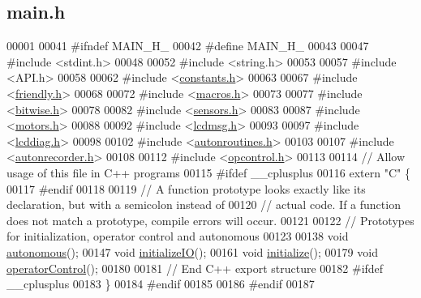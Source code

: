 \hypertarget{main_8h_source}{}\subsection{main.\+h}
\label{main_8h_source}

\begin{DoxyCode}
00001 
00041 \textcolor{preprocessor}{#ifndef MAIN\_H\_}
00042 \textcolor{preprocessor}{#define MAIN\_H\_}
00043 
00047 \textcolor{preprocessor}{#include <stdint.h>}
00048 
00052 \textcolor{preprocessor}{#include <string.h>}
00053 
00057 \textcolor{preprocessor}{#include <API.h>}
00058 
00062 \textcolor{preprocessor}{#include <\hyperlink{constants_8h}{constants.h}>}
00063 
00067 \textcolor{preprocessor}{#include <\hyperlink{friendly_8h}{friendly.h}>}
00068 
00072 \textcolor{preprocessor}{#include <\hyperlink{macros_8h}{macros.h}>}
00073 
00077 \textcolor{preprocessor}{#include <\hyperlink{bitwise_8h}{bitwise.h}>}
00078 
00082 \textcolor{preprocessor}{#include <\hyperlink{sensors_8h}{sensors.h}>}
00083 
00087 \textcolor{preprocessor}{#include <\hyperlink{motors_8h}{motors.h}>}
00088 
00092 \textcolor{preprocessor}{#include <\hyperlink{lcdmsg_8h}{lcdmsg.h}>}
00093 
00097 \textcolor{preprocessor}{#include <\hyperlink{lcddiag_8h}{lcddiag.h}>}
00098 
00102 \textcolor{preprocessor}{#include <\hyperlink{autonroutines_8h}{autonroutines.h}>}
00103 
00107 \textcolor{preprocessor}{#include <\hyperlink{autonrecorder_8h}{autonrecorder.h}>}
00108 
00112 \textcolor{preprocessor}{#include <\hyperlink{opcontrol_8h}{opcontrol.h}>}
00113 
00114 \textcolor{comment}{// Allow usage of this file in C++ programs}
00115 \textcolor{preprocessor}{#ifdef \_\_cplusplus}
00116 \textcolor{keyword}{extern} \textcolor{stringliteral}{"C"} \{
00117 \textcolor{preprocessor}{#endif}
00118 
00119 \textcolor{comment}{// A function prototype looks exactly like its declaration, but with a semicolon instead of}
00120 \textcolor{comment}{// actual code. If a function does not match a prototype, compile errors will occur.}
00121 
00122 \textcolor{comment}{// Prototypes for initialization, operator control and autonomous}
00123 
00138 \textcolor{keywordtype}{void} \hyperlink{main_8h_a3c7ca506bbc071fa740de13805b7f376}{autonomous}();
00147 \textcolor{keywordtype}{void} \hyperlink{main_8h_ad9cda921edb01125bb13c2f86bcf624b}{initializeIO}();
00161 \textcolor{keywordtype}{void} \hyperlink{main_8h_a25a40b6614565f755233080a384c35f1}{initialize}();
00179 \textcolor{keywordtype}{void} \hyperlink{main_8h_ac71a94af413917f27d108e95c4d6f6a7}{operatorControl}();
00180 
00181 \textcolor{comment}{// End C++ export structure}
00182 \textcolor{preprocessor}{#ifdef \_\_cplusplus}
00183 \}
00184 \textcolor{preprocessor}{#endif}
00185 
00186 \textcolor{preprocessor}{#endif}
00187 
\end{DoxyCode}

